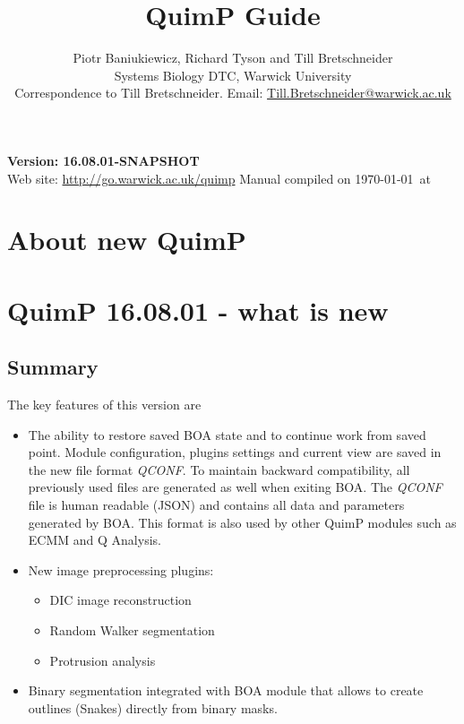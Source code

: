 \documentclass[a4paper,12pt]{article}
\begin{document}
\title{QuimP Guide}
\author{Piotr Baniukiewicz, Richard Tyson and Till Bretschneider\\ \small Systems Biology DTC, Warwick University\\ \small Correspondence to Till Bretschneider. Email: \href{mailto:Till.Bretschneider@warwick.ac.uk}{Till.Bretschneider@warwick.ac.uk}\\}
\date{}
\maketitle
\begin{center}
\textbf{{\large Version: 16.08.01-SNAPSHOT}}\\
\vspace{1cm}
Web site: \url{http://go.warwick.ac.uk/quimp}
\vfill
{\footnotesize Manual compiled on \today\  at \currenttime}
\end{center}

\tableofcontents

\setlength{\parskip}{10pt}
\setlength{\parindent}{0pt}

\section{About new QuimP}

\section{QuimP 16.08.01 - what is new}

\subsection{Summary}
The key features of this version are 
\begin{itemize}
	\item The ability to restore saved BOA state and to continue work from saved point. Module  configuration, plugins settings and current view are saved in the new file format \textit{QCONF}. To maintain backward compatibility, all previously used files are generated as well when exiting BOA. The \textit{QCONF} file is human readable (JSON) and contains all data and parameters generated by BOA. This format is also used by other QuimP modules such as ECMM and Q Analysis. 
	\item New image preprocessing plugins:
	\begin{itemize}
		\item DIC image reconstruction
		\item Random Walker segmentation
		\item Protrusion analysis
	\end{itemize}   
	\item Binary segmentation integrated with BOA module that allows to create outlines (Snakes) directly from binary masks.
\end{itemize}
	
\end{document}
